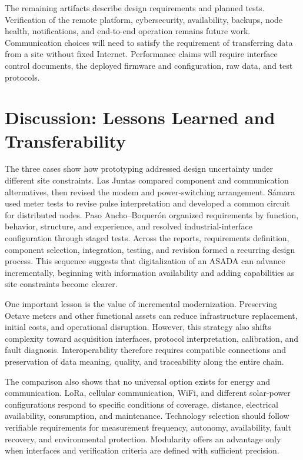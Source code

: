 \documentclass[conference]{IEEEtran}
\begin{document}
The remaining artifacts describe design requirements and planned tests. Verification of the remote platform, cybersecurity, availability, backups, node health, notifications, and end-to-end operation remains future work. Communication choices will need to satisfy the requirement of transferring data from a site without fixed Internet. Performance claims will require interface control documents, the deployed firmware and configuration, raw data, and test protocols.

\section{Discussion: Lessons Learned and Transferability}
The three cases show how prototyping addressed design uncertainty under different site constraints. Las Juntas compared component and communication alternatives, then revised the modem and power-switching arrangement. Sámara used meter tests to revise pulse interpretation and developed a common circuit for distributed nodes. Paso Ancho--Boquerón organized requirements by function, behavior, structure, and experience, and resolved industrial-interface configuration through staged tests. Across the reports, requirements definition, component selection, integration, testing, and revision formed a recurring design process. This sequence suggests that digitalization of an ASADA can advance incrementally, beginning with information availability and adding capabilities as site constraints become clearer.

One important lesson is the value of incremental modernization. Preserving Octave meters and other functional assets can reduce infrastructure replacement, initial costs, and operational disruption. However, this strategy also shifts complexity toward acquisition interfaces, protocol interpretation, calibration, and fault diagnosis. Interoperability therefore requires compatible connections and preservation of data meaning, quality, and traceability along the entire chain.

The comparison also shows that no universal option exists for energy and communication. LoRa, cellular communication, WiFi, and different solar-power configurations respond to specific conditions of coverage, distance, electrical availability, consumption, and maintenance. Technology selection should follow verifiable requirements for measurement frequency, autonomy, availability, fault recovery, and environmental protection. Modularity offers an advantage only when interfaces and verification criteria are defined with sufficient precision.
\end{document}
